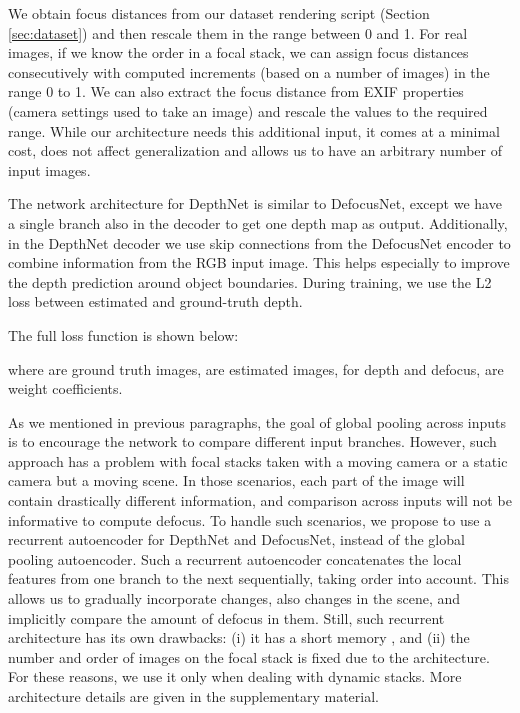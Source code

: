 \documentclass[10pt,twocolumn,letterpaper]{article}
\begin{document}
We obtain focus distances from our dataset rendering script (Section \ref{sec:dataset}) and then rescale them in the range between 0 and 1.
For real images, if we know the order in a focal stack, we can assign focus distances consecutively with computed increments (based on a number of images) in the range 0 to 1. We can also extract the focus distance from EXIF properties (camera settings used to take an image) and rescale the values to the required range. 
While our architecture needs this additional input, it comes at a minimal cost, does not affect generalization and allows us to have an arbitrary number of input images.

The network architecture for DepthNet is similar to DefocusNet, except we have a single branch also in the decoder to get one depth map as output.
Additionally, in the DepthNet decoder we use
skip connections from the DefocusNet encoder to combine information from the RGB input image. This helps especially to improve the depth prediction around object boundaries.
During training, we use the L2 loss between estimated and ground-truth depth.

The full loss function is shown below:



where  are ground truth images,  are estimated images, for depth and defocus,  are weight coefficients.


As we mentioned in previous paragraphs, the goal of global pooling across inputs is to encourage the network to compare different input branches. 
However, such approach has a problem with focal stacks taken with a moving camera or a static camera but a moving scene. In those scenarios, each part of the image will contain drastically different information, and comparison across inputs will not be informative to compute defocus.
To handle such scenarios, we propose to use a recurrent autoencoder \cite{DBLP:journals/tog/ChaitanyaKSSLNA17} for DepthNet and DefocusNet, instead of the global pooling autoencoder.
Such a recurrent autoencoder concatenates the local features from one branch to the next sequentially, taking order into account. 
This allows us to gradually incorporate changes, also changes in the scene, and implicitly compare the amount of defocus in them.
Still, such recurrent architecture has its own drawbacks: (i) it has a short memory \cite{DBLP:journals/tnn/BengioSF94}, and (ii) the number and order of images on the focal stack is fixed due to the architecture. 
For these reasons, we use it only when dealing with dynamic stacks.
More architecture details are given in the supplementary material.
\end{document}
